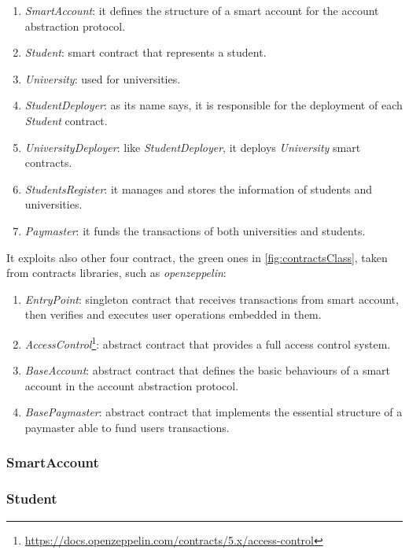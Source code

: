 \begin{enumerate}
    \item \textit{SmartAccount}: it defines the structure of a smart account for the account abstraction protocol.
    \item \textit{Student}: smart contract that represents a student.
    \item \textit{University}: used for universities.
    \item \textit{StudentDeployer}: as its name says, it is responsible for the deployment of each \textit{Student} contract.
    \item \textit{UniversityDeployer}: like \textit{StudentDeployer}, it deploys \textit{University} smart contracts.
    \item \textit{StudentsRegister}: it manages and stores the information of students and universities.
    \item \textit{Paymaster}: it funds the transactions of both universities and students.
\end{enumerate}
It exploits also other four contract, the green ones in \cref{fig:contractsClass}, taken from contracts libraries, such as \textit{openzeppelin}:
\begin{enumerate}
    \item \textit{EntryPoint}: singleton contract that receives transactions from smart account, then verifies and executes user operations embedded in them.
    \item \textit{AccessControl}\footnote{\url{https://docs.openzeppelin.com/contracts/5.x/access-control}}: abstract contract that provides a full access control system.
    \item \textit{BaseAccount}: abstract contract that defines the basic behaviours of a smart account in the account abstraction protocol.
    \item \textit{BasePaymaster}: abstract contract that implements the essential structure of a paymaster able to fund users transactions.  
\end{enumerate}

\subsubsection{SmartAccount}

\subsubsection{Student}
\label{sssec:studentContract}

